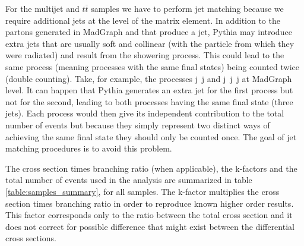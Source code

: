 For the multijet and $t\overline{t}$ samples we have to perform jet matching because we require additional jets at the level of the matrix element. In addition to the partons generated in MadGraph and that produce a jet, Pythia may introduce extra jets that are usually soft and collinear (with the particle from which they were radiated) and result from the showering process. This could lead to the same process (meaning processes with the same final states) being counted twice (double counting). Take, for example, the processes j~j and  j~j~j at MadGraph level. It can happen that Pythia generates an extra jet for the first process but not for the second, leading to both processes having the same final state (three jets). Each process would then give its independent contribution to the total number of events but because they simply represent two distinct ways of achieving the same final state they should only be counted once. The goal of jet matching procedures is to avoid this problem. 


The cross section times branching ratio (when applicable), the k-factors and the total number of events used in the analysis are summarized in table \ref{table:samples_summary}, for all samples. The k-factor multiplies the cross section times branching ratio in order to reproduce known higher order results. This factor corresponds only to the ratio between the total cross section and it does not correct for possible difference that might exist between the differential cross sections.

